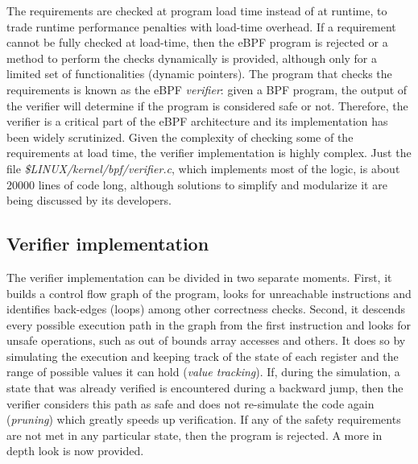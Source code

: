 
The requirements are checked at program load time instead of at runtime, to
trade runtime performance penalties with load-time overhead. If a requirement
cannot be fully checked at load-time, then the eBPF program is rejected or a
method to perform the checks dynamically is provided, although only for a
limited set of functionalities (dynamic pointers). The program that checks the
requirements is known as the eBPF \textit{verifier}: given a BPF program, the
output of the verifier will determine if the program is considered safe or not.
Therefore, the verifier is a critical part of the eBPF architecture and its
implementation has been widely scrutinized. Given the complexity of checking
some of the requirements at load time, the verifier implementation is highly
complex. Just the file \textit{\$LINUX/kernel/bpf/verifier.c}, which implements
most of the logic, is about $20000$ lines of code long, although solutions to
simplify and modularize it are being discussed by its developers.

\subsection*{Verifier implementation}

The verifier implementation can be divided in two separate moments. First, it
builds a control flow graph of the program, looks for unreachable instructions
and identifies back-edges (loops) among other correctness checks. Second, it
descends every possible execution path in the graph from the first instruction
and looks for unsafe operations, such as out of bounds array accesses and
others. It does so by simulating the execution and keeping track of the state of
each register and the range of possible values it can hold (\textit{value
tracking}). If, during the simulation, a state that was already verified is
encountered during a backward jump, then the verifier considers this path as
safe and does not re-simulate the code again (\textit{pruning}) which greatly
speeds up verification. If any of the safety requirements are not met in any
particular state, then the program is rejected. A more in depth look is now
provided.


